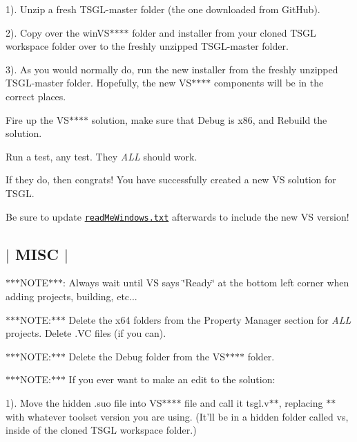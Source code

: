 1). Unzip a fresh {\ttfamily T\-S\-G\-L-\/master} folder (the one downloaded from Git\-Hub).

2). Copy over the {\ttfamily win\-V\-S$\ast$$\ast$$\ast$$\ast$} folder and installer from your cloned T\-S\-G\-L workspace folder over to the freshly unzipped {\ttfamily T\-S\-G\-L-\/master} folder.

3). As you would normally do, run the new installer from the freshly unzipped {\ttfamily T\-S\-G\-L-\/master} folder. Hopefully, the new {\ttfamily V\-S$\ast$$\ast$$\ast$$\ast$} components will be in the correct places.

Fire up the {\ttfamily V\-S$\ast$$\ast$$\ast$$\ast$} solution, make sure that {\ttfamily Debug} is {\ttfamily x86}, and {\ttfamily Rebuild} the solution.

Run a test, any test. They {\itshape A\-L\-L} should work.

If they do, then congrats! You have successfully created a new V\-S solution for T\-S\-G\-L.

Be sure to update \href{https://github.com/Calvin-CS/TSGL/blob/master/readMeWindows.txt}{\tt read\-Me\-Windows.\-txt} afterwards to include the new V\-S version! 

 \subsection*{$\vert$ M\-I\-S\-C $\vert$ }

$\ast$$\ast$$\ast$\-N\-O\-T\-E$\ast$$\ast$$\ast$\-: Always wait until V\-S says \char`\"{}\-Ready\char`\"{} at the bottom left corner when adding projects, building, etc...

$\ast$$\ast$$\ast$\-N\-O\-T\-E\-:$\ast$$\ast$$\ast$ Delete the {\ttfamily x64} folders from the {\ttfamily Property Manager} section for {\itshape A\-L\-L} projects. Delete {\ttfamily .V\-C} files (if you can).

$\ast$$\ast$$\ast$\-N\-O\-T\-E\-:$\ast$$\ast$$\ast$ Delete the {\ttfamily Debug} folder from the V\-S$\ast$$\ast$$\ast$$\ast$ folder.

$\ast$$\ast$$\ast$\-N\-O\-T\-E\-:$\ast$$\ast$$\ast$ If you ever want to make an edit to the solution\-:

1). Move the hidden {\ttfamily .suo} file into {\ttfamily V\-S$\ast$$\ast$$\ast$$\ast$} file and call it {\ttfamily tsgl.\-v$\ast$$\ast$}, replacing {\ttfamily $\ast$$\ast$} with whatever toolset version you are using. (It'll be in a hidden folder called {\ttfamily vs}, inside of the cloned T\-S\-G\-L workspace folder.)

